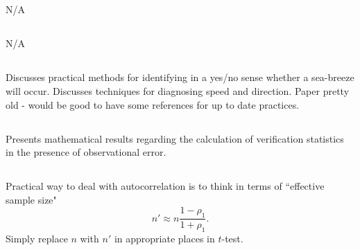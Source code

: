 \documentclass{article}
\begin{document}
\subsection{\citet{ebert00}}
N/A

\subsection{\citet{yates06}}
N/A

\subsection{\citet{mason08}}
Discusses practical methods for identifying in a yes/no sense whether a sea-breeze will occur. Discusses techniques for diagnosing speed and direction. Paper pretty old - would be good to have some references for up to date practices.  

\subsection{\citet{ferro17}}
Presents mathematical results regarding the calculation of verification statistics in the presence of observational error. 

\subsection{\citet{wilks11}}
Practical way to deal with autocorrelation is to think in terms of ``effective sample size" 
\begin{equation}
n' \approx n \frac{1-\rho_1}{1+\rho_1}.
\end{equation} 
Simply replace $n$ with $n'$ in appropriate places in $t$-test. 

\subsection{\citet{miller03}}



\end{document}
